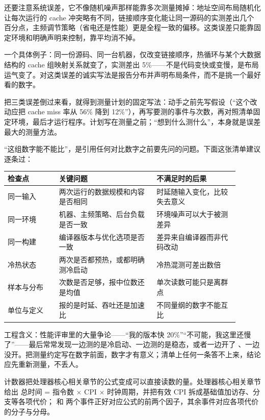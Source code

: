 还要注意系统误差，它不像随机噪声那样能靠多次测量摊掉：地址空间布局随机化让每次运行的 cache 冲突略有不同，链接顺序变化能让同一源码的实测差出几个百分点，主频调节策略（省电还是性能）更是全程一致的偏移。这类误差只能靠固定环境和明确声明来控制，靠平均消不掉。

一个具体例子：同一份源码、同一台机器，仅改变链接顺序，热循环与某个大数据结构的 cache 组映射关系就变了，实测差出 5\%——不是代码变快或变慢，是布局运气变了。对这类误差的诚实写法是报告分布并声明布局条件，而不是挑一个最好看的数字。

把三类误差倒过来看，就得到测量计划的固定写法：动手之前先写假设（“这个改动应把 cache miss 率从 56\% 降到 12\%”），再写要测的事件与次数，再对照清单固定环境，最后才运行程序。计划写在测量之前；“想到什么测什么”，本身就是误差最大的测量方法。

“这组数字能不能比”，是引用任何对比数字之前要先问的问题。下面这张清单建议逐条过：

\begin{longtable}{L{0.20\linewidth}L{0.38\linewidth}L{0.32\linewidth}}
\toprule
检查点 & 关键问题 & 不满足时的后果 \\
\midrule
同一输入 & 两次运行的数据规模和内容是否相同 & 时延随输入变化，比较失去意义 \\\tablerowrule
同一环境 & 机器、主频策略、后台负载是否一致 & 环境噪声可以大于被测差异 \\\tablerowrule
同一构建 & 编译器版本与优化选项是否一致 & 差异来自编译器而非代码改动 \\\tablerowrule
冷热状态 & 两次是否都预热，或都明确测冷启动 & 冷热混测可差出数倍 \\\tablerowrule
样本与分布 & 次数是否足够，报中位数还是均值 & 单次读数可能只是离群点 \\\tablerowrule
单位与定义 & 报的是时延、吞吐还是加速比 & 不同量纲的数字不能互比 \\
\bottomrule
\end{longtable}

工程含义：性能评审里的大量争论——“我的版本快 20\%”“不可能，我这里还慢了”——最后常常发现一边测的是冷启动、一边测的是稳态，或者一边开了 、一边没开。把测量约定写在数字前面，数字才有意义；清单上任何一条答不上来，结论应先重新测量，不丢人。

计数器把处理器核心相关章节的公式变成可以直接读数的量。处理器核心相关章节给出 总时间 = 指令数 $\times$ CPI $\times$ 时钟周期，并把有效 CPI 拆成基础值加访存、分支等各项代价； 和  两个事件正好对应公式的前两个因子，其余事件对应各项代价的分子与分母。

